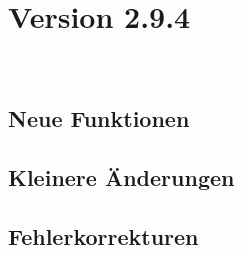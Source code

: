 \section{Version 2.9.4}\
\subsection{Neue Funktionen}
\begin{itemize}
\end{itemize}


\subsection{Kleinere Änderungen}
\begin{itemize}
\end{itemize}


\subsection{Fehlerkorrekturen}
\begin{itemize}
\end{itemize}
